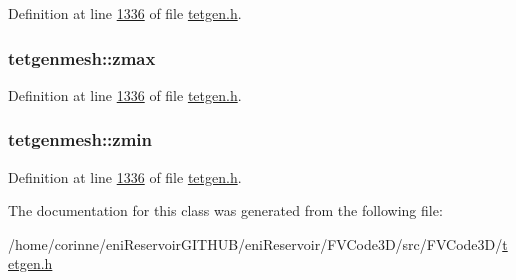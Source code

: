 Definition at line \hyperlink{tetgen_8h_source_l01336}{1336} of file \hyperlink{tetgen_8h_source}{tetgen.\+h}.

\subsubsection[{\texorpdfstring{zmax}{zmax}}]{ tetgenmesh\+::zmax}\hypertarget{classtetgenmesh_ac3ea8ccd4d30c7e2d4044d4f88628dda}{}\label{classtetgenmesh_ac3ea8ccd4d30c7e2d4044d4f88628dda}


Definition at line \hyperlink{tetgen_8h_source_l01336}{1336} of file \hyperlink{tetgen_8h_source}{tetgen.\+h}.

\subsubsection[{\texorpdfstring{zmin}{zmin}}]{ tetgenmesh\+::zmin}\hypertarget{classtetgenmesh_ad61db1a7fc133880cc65458ab77597eb}{}\label{classtetgenmesh_ad61db1a7fc133880cc65458ab77597eb}


Definition at line \hyperlink{tetgen_8h_source_l01336}{1336} of file \hyperlink{tetgen_8h_source}{tetgen.\+h}.



The documentation for this class was generated from the following file\+:\begin{DoxyCompactItemize}
\item 
/home/corinne/eni\+Reservoir\+G\+I\+T\+H\+U\+B/eni\+Reservoir/\+F\+V\+Code3\+D/src/\+F\+V\+Code3\+D/\hyperlink{tetgen_8h}{tetgen.\+h}\end{DoxyCompactItemize}
